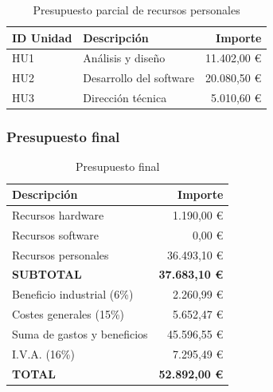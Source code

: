 \begin{table}[H]
 \begin{center}
  \begin{tabular}{|l|l|r|}
	\hline
	\textbf{ID Unidad} & \textbf{Descripción} & \textbf{Importe} \\
	\hline
	HU1 & Análisis y diseño & 11.402,00 \euro \\
	\hline
	HU2 & Desarrollo del software & 20.080,50 \euro \\
	\hline
	HU3 & Dirección técnica & 5.010,60 \euro \\
	\hline
  \end{tabular}
  \caption{Presupuesto parcial de recursos personales}
 \end{center}
\end{table}

\subsubsection{Presupuesto final}


\begin{table}[H]
 \begin{center}
  \begin{tabular}{|l|r|}
	\hline
	\textbf{Descripción} & \textbf{Importe} \\ 
	\hline
	Recursos hardware & 1.190,00 \euro \\
	\hline
	Recursos software & 0,00 \euro \\
	\hline
	Recursos personales & 36.493,10 \euro \\
	\hline
	\textbf{SUBTOTAL} & \textbf{37.683,10 \euro} \\
	\hline
	Beneficio industrial (6\%) & 2.260,99 \euro \\
	\hline
	Costes generales (15\%) & 5.652,47 \euro \\
	\hline
	Suma de gastos y beneficios & 45.596,55 \euro \\
	\hline
	I.V.A. (16\%) & 7.295,49 \euro \\
	\hline
	\textbf{TOTAL} & \Large\textbf{52.892,00 \euro} \\
	\hline
  \end{tabular}
  \caption{Presupuesto final}
 \end{center}
\end{table}
